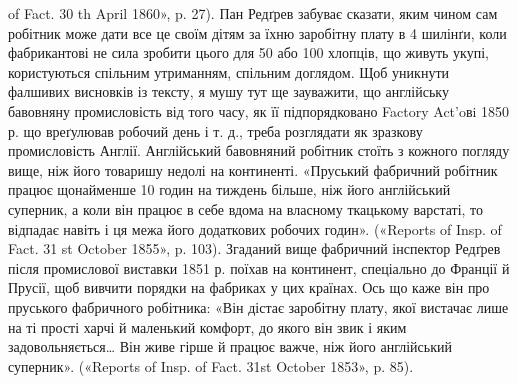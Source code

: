 {of Fact. 30 th April 1860», p. 27). Пан Редґрев забуває сказати, яким
чином сам робітник може дати все це своїм дітям за їхню заробітну плату
в 4 шилінґи, коли фабрикантові не сила зробити цього для 50 або 100
хлопців, що живуть укупі, користуються спільним утриманням, спільним
доглядом. Щоб уникнути фалшивих висновків із тексту, я мушу тут ще
зауважити, що англійську бавовняну промисловість від того часу, як
її підпорядковано Factory Act’oвi 1850 р. що вреґулював робочий день
і т. д., треба розглядати як зразкову промисловість Англії. Англійський
бавовняний робітник стоїть з кожного погляду вище, ніж його товаришу
недолі на континенті. «Пруський фабричний робітник працює щонайменше
10 годин на тиждень більше, ніж його англійський суперник, а коли він
працює в себе вдома на власному ткацькому варстаті, то відпадає навіть
і ця межа його додаткових робочих годин». («Reports of Insp. of Fact.
31 st October 1855», p. 103). Згаданий вище фабричний інспектор Редґрев
після промислової виставки 1851 р. поїхав на континент, спеціально до
Франції й Прусії, щоб вивчити порядки на фабриках у цих країнах.
Ось що каже він про пруського фабричного робітника: «Він дістає заробітну
плату, якої вистачає лише на ті прості харчі й маленький комфорт, до
якого він звик і яким задовольняється\dots{} Він живе гірше й працює важче,
ніж його англійський суперник». («Reports of Insp. of Fact. 31st October
1853», p. 85).
}

